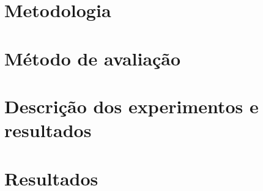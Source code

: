 \section{Metodologia}
\label{cha:metodologia}
	

\newpage

\section{Método de avaliação}
\label{cha:avaliacao_parceval}
	

\newpage

\section{Descrição dos experimentos e resultados}
\label{cha:experimentos}
	

\newpage

\section{Resultados}
\label{cha:resultados}
	

